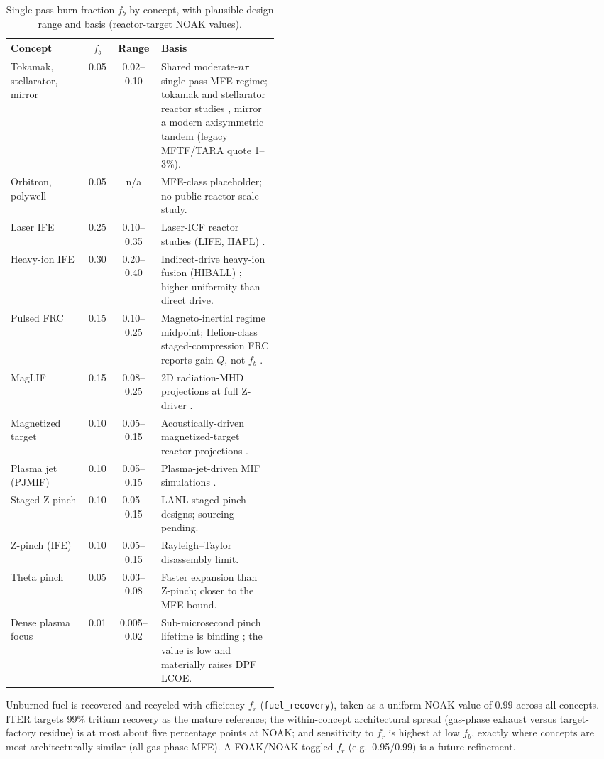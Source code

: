 \documentclass{article}
\begin{document}
\begin{table}[H]
\centering
\caption{Single-pass burn fraction $f_b$ by concept, with plausible design
range and basis (reactor-target NOAK values).}
\label{tab:burn-fraction}
\begin{tabular}{l c c p{0.44\linewidth}}
\toprule
Concept & $f_b$ & Range & Basis \\
\midrule
Tokamak, stellarator, mirror & 0.05 & 0.02--0.10 & Shared moderate-$n\tau$ single-pass MFE regime; tokamak and stellarator reactor studies \citep{najmabadi2006ariesat, najmabadi2008stellarator}, mirror a modern axisymmetric tandem \citep{frank2024} (legacy MFTF/TARA quote 1--3\%). \\
Orbitron, polywell & 0.05 & n/a & MFE-class placeholder; no public reactor-scale study. \\
Laser IFE & 0.25 & 0.10--0.35 & Laser-ICF reactor studies (LIFE, HAPL) \citep{moses2009life, sethian2010hapl}. \\
Heavy-ion IFE & 0.30 & 0.20--0.40 & Indirect-drive heavy-ion fusion (HIBALL) \citep{badger1984hiball}; higher uniformity than direct drive. \\
Pulsed FRC & 0.15 & 0.10--0.25 & Magneto-inertial regime midpoint; Helion-class staged-compression FRC reports gain $Q$, not $f_b$ \citep{slough2024frc}. \\
MagLIF & 0.15 & 0.08--0.25 & 2D radiation-MHD projections at full Z-driver \citep{slutz2010maglif}. \\
Magnetized target & 0.10 & 0.05--0.15 & Acoustically-driven magnetized-target reactor projections \citep{laberge2007mtf}. \\
Plasma jet (PJMIF) & 0.10 & 0.05--0.15 & Plasma-jet-driven MIF simulations \citep{hsu2019pjmif}. \\
Staged Z-pinch & 0.10 & 0.05--0.15 & LANL staged-pinch designs; sourcing pending. \\
Z-pinch (IFE) & 0.10 & 0.05--0.15 & Rayleigh--Taylor disassembly limit. \\
Theta pinch & 0.05 & 0.03--0.08 & Faster expansion than Z-pinch; closer to the MFE bound. \\
Dense plasma focus & 0.01 & 0.005--0.02 & Sub-microsecond pinch lifetime is binding \citep{lerner2023dpf}; the value is low and materially raises DPF LCOE. \\
\bottomrule
\end{tabular}
\end{table}

Unburned fuel is recovered and recycled with efficiency $f_r$
(\texttt{fuel\_recovery}), taken as a uniform NOAK value of $0.99$ across all
concepts. ITER targets 99\% tritium recovery as the mature reference; the
within-concept architectural spread (gas-phase exhaust versus target-factory
residue) is at most about five percentage points at NOAK; and sensitivity to
$f_r$ is highest at low $f_b$, exactly where concepts are most
architecturally similar (all gas-phase MFE). A FOAK/NOAK-toggled $f_r$
(e.g.\ 0.95/0.99) is a future refinement.
\end{document}
